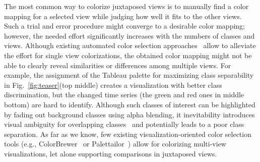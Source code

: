 The most common way to colorize juxtaposed views is to manually find a color mapping for a    selected view while judging how well it fits to the other views. Such a trial and error procedure might converge to a desirable color mapping; however, the needed effort significantly increases with the numbers of classes and views. %
Although existing automated color selection approaches~\cite{Chen14,Wang2018,Lu21} allow to alleviate the effort for single view colorizations, the obtained color mapping might not be able to clearly reveal similarities or differences among multiple views. For example, the assignment of the Tableau palette for maximizing class separability  in Fig.~\ref{fig:teaser}(top middle) creates a visualization with better class discrimination, but the changed time series (the green and red ones in middle bottom) are hard to identify.
Although such classes of interest can be highlighted by fading out background classes using alpha blending, it inevitability introduces visual ambiguity for overlapping classes~\cite{baudisch2004multiblending} and potentially leads to a poor class separation.
As far as we know, few existing visualization-oriented color selection tools (e.g., ColorBrewer~\cite{harrower2003colorbrewer} or Palettailor~\cite{Lu21}) allow for colorizing multi-view visualizations, let alone supporting comparisons in juxtaposed views.





